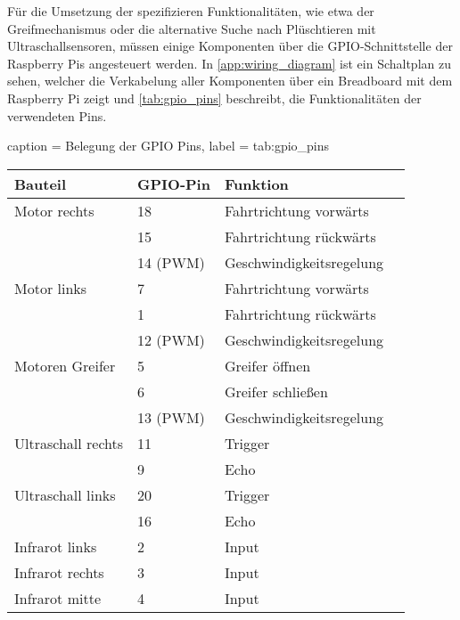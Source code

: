 Für die Umsetzung der spezifizieren Funktionalitäten, wie etwa der Greifmechanismus oder die alternative Suche nach Plüschtieren mit Ultraschallsensoren, müssen einige Komponenten über die \ac{GPIO}-Schnittstelle der Raspberry Pis angesteuert werden.
In \autoref{app:wiring_diagram} ist ein Schaltplan zu sehen, welcher die Verkabelung aller Komponenten über ein Breadboard mit dem Raspberry Pi zeigt und \autoref{tab:gpio_pins} beschreibt, die Funktionalitäten der verwendeten Pins.

\begin{dhbwtable}{%
    caption	= Belegung der \ac{GPIO} Pins,
    label	= tab:gpio_pins
}
    \begin{tabular}{llll}
        \toprule
        \textbf{Bauteil} & \textbf{\ac{GPIO}-Pin} & \textbf{Funktion} \\\midrule
        Motor rechts   	    & 18        & Fahrtrichtung vorwärts\\
                            & 15        & Fahrtrichtung rückwärts\\
                            & 14 (PWM)  & Geschwindigkeitsregelung\\
        Motor links   	    & 7         & Fahrtrichtung vorwärts\\
                            & 1         & Fahrtrichtung rückwärts\\
                            & 12 (PWM)  & Geschwindigkeitsregelung\\    
        Motoren Greifer   	& 5         & Greifer öffnen\\
                            & 6         & Greifer schließen\\
                            & 13 (PWM)  & Geschwindigkeitsregelung\\
        Ultraschall rechts 	& 11        & Trigger\\
                            & 9         & Echo\\
        Ultraschall links   & 20        & Trigger\\
                            & 16        & Echo \\ 
        Infrarot links      & 2         & Input\\
        Infrarot rechts     & 3         & Input\\
        Infrarot mitte      & 4         & Input\\\bottomrule
    \end{tabular}    
\end{dhbwtable}
